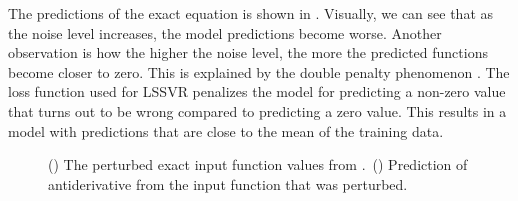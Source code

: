 \documentclass[preprint,12pt,times,authoryear]{elsarticle}
\begin{document}
The predictions of the exact equation is shown in . Visually, we can see that as the noise level increases, the model predictions become worse. Another observation is how the higher the noise level, the more the predicted functions become closer to zero. This is explained by the double penalty phenomenon \citep{lledoScaledependentVerificationPrecipitation2023}. The loss function used for LSSVR penalizes the model for predicting a non-zero value that turns out to be wrong compared to predicting a zero value. This results in a model with predictions that are close to the mean of the training data.
\begin{figure}[H]
  \centering
  \begin{subfigure}{\linewidth}
    \begin{adjustbox}{width=\linewidth}
      
    \end{adjustbox}
    \caption{}\label{fig:antiderivative_exact_input}
  \end{subfigure}
  \begin{subfigure}{\linewidth}
    \begin{adjustbox}{width=\linewidth}
      
    \end{adjustbox}
    \caption{}\label{fig:antiderivative_exact_prediction}
  \end{subfigure}
  \caption{() The perturbed exact input function values from .\ () Prediction of antiderivative from the input function that was perturbed.}\label{fig:antiderivative_exact}
\end{figure}
\end{document}
